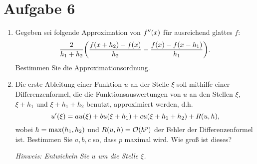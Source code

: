 \documentclass{exercise}
\begin{document}
    \section*{Aufgabe 6}
    
    \begin{problem}
        \begin{enumerate}
            \item Gegeben sei folgende Approximation von \(f''\parentheses*{x}\) für ausreichend glattes \(f\):
            \[
                \frac{2}{h_1 + h_2}\parentheses*{\frac{f\parentheses*{x + h_2} - f\parentheses*{x}}{h_2} - \frac{f\parentheses*{x} - f\parentheses*{x - h_1}}{h_1}}.
            \]
            Bestimmen Sie die Approximationsordnung.
            \item Die erste Ableitung einer Funktion \(u\) an der Stelle \(\xi\) soll mithilfe einer Differenzenformel, die die Funktionsauswertungen von \(u\) an den Stellen \(\xi\), \(\xi + h_1\) und \(\xi + h_1 + h_2\) benutzt, approximiert werden, d.h.
            \[
                u'\parentheses*{\xi} = au\parentheses*{\xi} + bu\parentheses*{\xi + h_1} + cu\parentheses*{\xi + h_1 + h_2} + R\parentheses*{u, h},
            \]
            wobei \(h = \max\parentheses*{h_1, h_2}\) und \(R\parentheses*{u, h} = \mathcal{O}\parentheses*{h^p}\) der Fehler der Differenzenformel ist.
            Bestimmen Sie \(a, b, c\) so, dass \(p\) maximal wird.
            Wie groß ist dieses?

            \emph{Hinweis: Entwickeln Sie \(u\) um die Stelle \(\xi\).}
        \end{enumerate}
    \end{problem}
    
\end{document}
